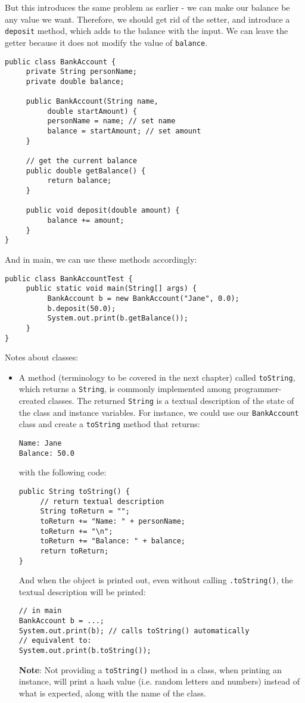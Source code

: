 But this introduces the same problem as earlier - we can make our balance be any value we want. Therefore, we should get rid of the setter, and introduce a \verb|deposit| method, which adds to the balance with the input. We can leave the getter because it does not modify the value of \verb|balance|.
\begin{lstlisting}
public class BankAccount {
     private String personName;
     private double balance;
     
     public BankAccount(String name, 
          double startAmount) {
          personName = name; // set name
          balance = startAmount; // set amount
     }
     
     // get the current balance
     public double getBalance() {
          return balance;
     }
     
     public void deposit(double amount) {
          balance += amount;
     }
}
\end{lstlisting}
And in main, we can use these methods accordingly:
\begin{lstlisting}
public class BankAccountTest {
     public static void main(String[] args) {
          BankAccount b = new BankAccount("Jane", 0.0);
          b.deposit(50.0);
          System.out.print(b.getBalance());
     }
}
\end{lstlisting}

\noindent Notes about classes:
\begin{itemize}
\item A method (terminology to be covered in the next chapter) called \verb|toString|, which returns a \verb|String|, is commonly implemented among programmer-created classes. The returned \verb|String| is a textual description of the state of the class and instance variables. For instance, we could use our \verb|BankAccount| class and create a \verb|toString| method that returns:
\begin{verbatim}
Name: Jane
Balance: 50.0
\end{verbatim}
with the following code:
\begin{lstlisting}
public String toString() {
     // return textual description
     String toReturn = "";
     toReturn += "Name: " + personName;
     toReturn += "\n";
     toReturn += "Balance: " + balance;
     return toReturn;
}
\end{lstlisting}
And when the object is printed out, even without calling \verb|.toString()|, the textual description will be printed:
\begin{lstlisting}
// in main
BankAccount b = ...;
System.out.print(b); // calls toString() automatically
// equivalent to:
System.out.print(b.toString());
\end{lstlisting}
\textbf{Note}: Not providing a \verb|toString()| method in a class, when printing an instance, will print a hash value (i.e. random letters and numbers) instead of what is expected, along with the name of the class.
\end{itemize}

